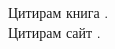 \documentclass[../masters-thesis.tex]{subfiles}
\begin{document}
Цитирам книга \cite{samplebook}.
\\
Цитирам сайт \cite{samplewebsite}.
\end{document}
